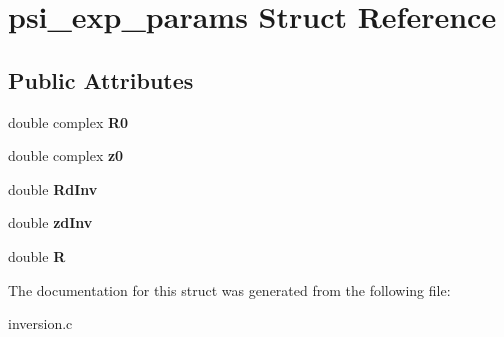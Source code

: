 \hypertarget{structpsi__exp__params}{}\section{psi\+\_\+exp\+\_\+params Struct Reference}
\label{structpsi__exp__params}
\subsection*{Public Attributes}
\begin{DoxyCompactItemize}
\item 
\mbox{\label{structpsi__exp__params_a76ce4ec38e5423722884d01647205414}} 
double complex {\bfseries R0}
\item 
\mbox{\label{structpsi__exp__params_afbc3780c9fbb322b5c49c1d3e53563aa}} 
double complex {\bfseries z0}
\item 
\mbox{\label{structpsi__exp__params_a35f634ce118410caabe3c14f3b920c71}} 
double {\bfseries Rd\+Inv}
\item 
\mbox{\label{structpsi__exp__params_abaae01edfb529762817aba8b0c03a4d6}} 
double {\bfseries zd\+Inv}
\item 
\mbox{\label{structpsi__exp__params_a0be2608815ceaaa7bf44a8159f68abca}} 
double {\bfseries R}
\end{DoxyCompactItemize}


The documentation for this struct was generated from the following file\+:\begin{DoxyCompactItemize}
\item 
inversion.\+c\end{DoxyCompactItemize}

